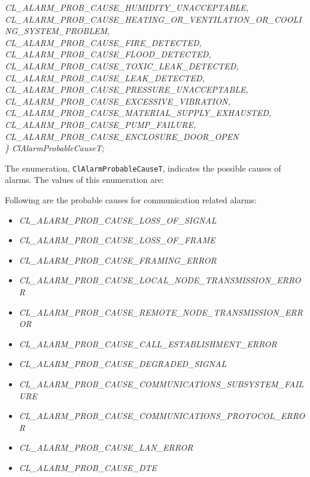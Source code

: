\begin{flushleft}
\begin{tabbing}
\>\>\>\>\textit{CL\_ALARM\_PROB\_CAUSE\_HUMIDITY\_UNACCEPTABLE,}\\
\>\>\>\>\textit{CL\_ALARM\_PROB\_CAUSE\_HEATING\_OR\_VENTILATION\_OR\_COOLING\_SYSTEM\_PROBLEM,}\\
\>\>\>\>\textit{CL\_ALARM\_PROB\_CAUSE\_FIRE\_DETECTED,}\\
\>\>\>\>\textit{CL\_ALARM\_PROB\_CAUSE\_FLOOD\_DETECTED,}\\
\>\>\>\>\textit{CL\_ALARM\_PROB\_CAUSE\_TOXIC\_LEAK\_DETECTED,}\\
\>\>\>\>\textit{CL\_ALARM\_PROB\_CAUSE\_LEAK\_DETECTED,}\\
\>\>\>\>\textit{CL\_ALARM\_PROB\_CAUSE\_PRESSURE\_UNACCEPTABLE,}\\
\>\>\>\>\textit{CL\_ALARM\_PROB\_CAUSE\_EXCESSIVE\_VIBRATION,}\\
\>\>\>\>\textit{CL\_ALARM\_PROB\_CAUSE\_MATERIAL\_SUPPLY\_EXHAUSTED,}\\
\>\>\>\>\textit{CL\_ALARM\_PROB\_CAUSE\_PUMP\_FAILURE,}\\
\>\>\>\>\textit{CL\_ALARM\_PROB\_CAUSE\_ENCLOSURE\_DOOR\_OPEN}\\ 
\textit{\} ClAlarmProbableCauseT;}\end{tabbing}
The enumeration, {\tt{ClAlarmProbableCauseT}}, indicates the possible causes of alarms. The values of this enumeration are:
\par
Following are the probable causes for communication related alarms:
\begin{itemize}
\item
\textit{CL\_\-ALARM\_\-PROB\_\-CAUSE\_\-LOSS\_\-OF\_\-SIGNAL}
\item \textit{CL\_\-ALARM\_\-PROB\_\-CAUSE\_\-LOSS\_\-OF\_\-FRAME}
\item \textit{CL\_\-ALARM\_\-PROB\_\-CAUSE\_\-FRAMING\_\-ERROR}
\item \textit{CL\_\-ALARM\_\-PROB\_\-CAUSE\_\-LOCAL\_\-NODE\_\-TRANSMISSION\_\-ERROR}
\item \textit{CL\_\-ALARM\_\-PROB\_\-CAUSE\_\-REMOTE\_\-NODE\_\-TRANSMISSION\_\-ERROR}
\item \textit{CL\_\-ALARM\_\-PROB\_\-CAUSE\_\-CALL\_\-ESTABLISHMENT\_\-ERROR}
\item \textit{CL\_\-ALARM\_\-PROB\_\-CAUSE\_\-DEGRADED\_\-SIGNAL}
\item \textit{CL\_\-ALARM\_\-PROB\_\-CAUSE\_\-COMMUNICATIONS\_\-SUBSYSTEM\_\-FAILURE}
\item \textit{CL\_\-ALARM\_\-PROB\_\-CAUSE\_\-COMMUNICATIONS\_\-PROTOCOL\_\-ERROR}
\item \textit{CL\_\-ALARM\_\-PROB\_\-CAUSE\_\-LAN\_\-ERROR}
\item \textit{CL\_\-ALARM\_\-PROB\_\-CAUSE\_\-DTE}
\end{itemize}



\end{flushleft}
